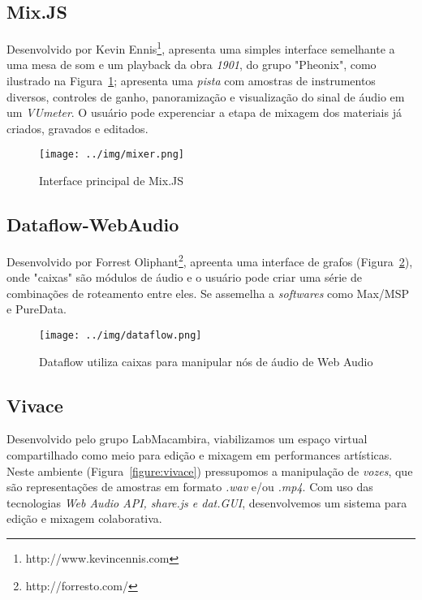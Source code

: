 \documentclass
  [ams,pdfout]%
        {aesbr}
\begin{document}
\subsection{Mix.JS}

Desenvolvido por Kevin Ennis\footnote{http://www.kevincennis.com},
apresenta uma simples interface semelhante a uma mesa de som e um
playback da obra \emph{1901}, do grupo "Pheonix", como ilustrado na
Figura~\ref{fig:mixer}; apresenta uma \emph{pista} com amostras de
instrumentos diversos, controles de ganho, panoramização e
visualização do sinal de áudio em um \emph{VUmeter}. O usuário pode
experenciar a etapa de mixagem dos materiais já criados, gravados e
editados.

\begin{figure}[htpb]
  \begin{center}
    \texttt{[image: ../img/mixer.png]}
    \caption{Interface principal de Mix.JS}
    \label{fig:mixer}
  \end{center}
\end{figure}

\subsection{Dataflow-WebAudio}

Desenvolvido por Forrest Oliphant\footnote{http://forresto.com/},
apreenta uma interface de grafos (Figura~\ref{fig:dataflow}), onde
"caixas" são módulos de áudio e o usuário pode criar uma série de
combinações de roteamento entre eles. Se assemelha a \emph{softwares}
como Max/MSP e PureData.

\begin{figure}[htpb]
  \begin{center}
    \texttt{[image: ../img/dataflow.png]}
    \caption{Dataflow utiliza caixas para manipular nós de áudio de
      Web Audio}
    \label{fig:dataflow}
  \end{center}
\end{figure}

\subsection{Vivace}

Desenvolvido pelo grupo LabMacambira, viabilizamos um espaço virtual
compartilhado como meio para edição e mixagem em performances
artísticas. Neste ambiente (Figura~\ref{figure:vivace}) pressupomos a
manipulação de \emph{vozes}, que são representações de amostras em
formato \emph{.wav} e/ou \emph{.mp4}. Com uso das tecnologias
\emph{Web Audio API, share.js e dat.GUI}, desenvolvemos um sistema
para edição e mixagem colaborativa.
\end{document}

